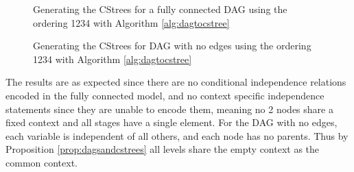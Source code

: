 \documentclass{tufte-book}
\begin{document}
\begin{Definition}
\begin{figure}[!h]\label{fig:dagtocstree_cstree}
   \begin{floatrow}
%
\caption{Generating the CStrees for a fully connected DAG using the ordering 1234 with Algorithm \ref{alg:dagtocstree}}
        
   \end{floatrow}
\end{figure}

\begin{figure}[!h]\label{fig:dagtocstree_cstree}
   \begin{floatrow}
%
\caption{Generating the CStrees for DAG with no edges using the ordering 1234 with Algorithm \ref{alg:dagtocstree}}
        
   \end{floatrow}
\end{figure}

The results are as expected since there are no conditional independence relations encoded in the fully connected model, and no context specific independence statements since they are unable to encode them, meaning no 2 nodes share a fixed context and all stages have a single element. For the DAG with no edges, each variable is independent of all others, and each node has no parents. Thus by Proposition \ref{prop:dagsandcstrees} all levels share the empty context as the common context. 


\end{Definition}
\end{document}
